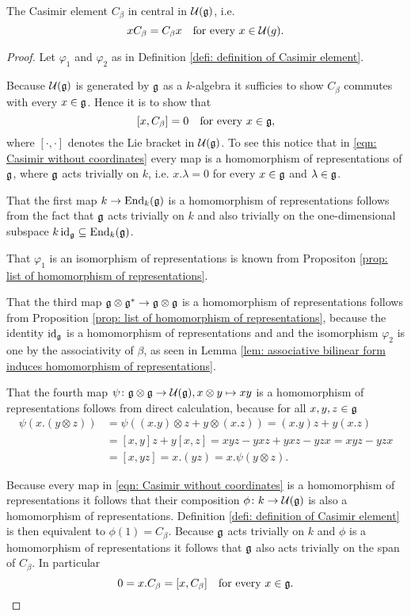 \begin{lem}
 The Casimir element $C_\beta$ in central in $\mathcal{U}(\mathfrak{g})$, i.e.\
 \[
  x C_\beta = C_\beta x \quad \text{for every $x \in \mathcal{U}(g)$}.
 \]
\end{lem}
\begin{proof}
 Let $\varphi_1$ and $\varphi_2$ as in Definition \ref{defi: definition of Casimir element}.
 
 Because $\mathcal{U}(\mathfrak{g})$ is generated by $\mathfrak{g}$ as a $k$-algebra it sufficies to show $C_\beta$ commutes with every $x \in \mathfrak{g}$. Hence it is to show that
 \[
  [x,C_\beta] = 0 \quad \text{for every $x \in \mathfrak{g}$},
 \]
 where $[\cdot,\cdot]$ denotes the Lie bracket in $\mathcal{U}(\mathfrak{g})$. To see this notice that in \eqref{eqn: Casimir without coordinates} every map is a homomorphism of representations of $\mathfrak{g}$, where $\mathfrak{g}$ acts trivially on $k$, i.e. $x.\lambda = 0$ for every $x \in \mathfrak{g}$ and $\lambda \in \mathfrak{g}$.
 
 That the first map $k \to \operatorname{End}_k(\mathfrak{g})$ is a homomorphism of representations follows from the fact that $\mathfrak{g}$ acts trivially on $k$ and also trivially on the one-dimensional subspace $k \operatorname{id}_{\mathfrak{g}} \subseteq \operatorname{End}_k(\mathfrak{g})$.
 
 That $\varphi_1$ is an isomorphism of representations is known from Propositon \ref{prop: list of homomorphism of representations}.
 
 That the third map $\mathfrak{g} \otimes \mathfrak{g}^* \to \mathfrak{g} \otimes \mathfrak{g}$ is a homomorphism of representations follows from Proposition \ref{prop: list of homomorphism of representations}, because the identity $\operatorname{id}_{\mathfrak{g}}$ is a homomorphism of representations and and the isomorphism $\varphi_2$ is one by the associativity of $\beta$, as seen in Lemma \ref{lem: associative bilinear form induces homomorphism of representations}.
 
 That the fourth map $\psi \colon \mathfrak{g} \otimes \mathfrak{g} \to \mathcal{U}(\mathfrak{g}), x \otimes y \mapsto xy$ is a homomorphism of representations follows from direct calculation, because for all $x,y,z \in \mathfrak{g}$
 \begin{align*}
  \psi(x.(y \otimes z))
  &= \psi((x.y) \otimes z + y \otimes (x.z))
  = (x.y)z + y(x.z) \\
  &= [x,y]z + y[x,z]
  = xyz - yxz + yxz - yzx
  = xyz - yzx \\
  &= [x,yz]
  = x.(yz)
  = x.\psi(y \otimes z).
 \end{align*}
 
 Because every map in \eqref{eqn: Casimir without coordinates} is a homomorphism of representations it follows that their composition $\phi \colon k \to \mathcal{U}(\mathfrak{g})$ is also a homomorphism of representations. Definition \ref{defi: definition of Casimir element} is then equivalent to $\phi(1) = C_\beta$. Because $\mathfrak{g}$ acts trivially on $k$ and $\phi$ is a homomorphism of representations it follows that $\mathfrak{g}$ also acts trivially on the span of $C_\beta$. In particular
 \[
  0 = x.C_\beta = [x,C_\beta] \quad \text{for every $x \in \mathfrak{g}$}.
  \qedhere
 \]
\end{proof}


